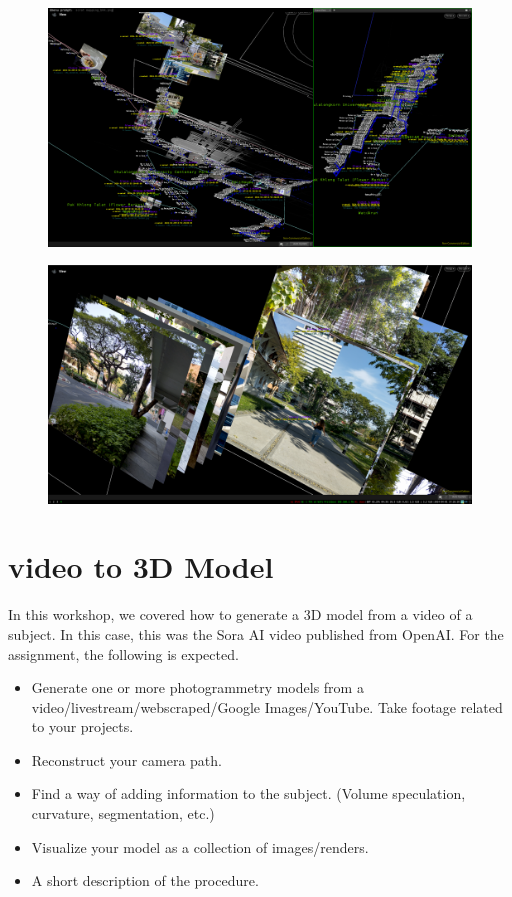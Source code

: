 \documentclass[11pt, a4paper]{article}
\begin{document}
\begin{figure}[H]
	\includegraphics[width=\textwidth]{media/mapping_bkk.png}
\end{figure}

\begin{figure}[H]
	\includegraphics[width=\textwidth]{media/mapping_bkk2.png}
\end{figure}


\newpage
\section {video to 3D Model}

In this workshop, we covered how to generate a 3D model from a video of a
subject. In this case, this was the Sora AI video published from OpenAI. For
the assignment, the following is expected.

\begin{itemize}
	\item Generate one or more photogrammetry models from a
video/livestream/webscraped/Google Images/YouTube. Take footage related to your
projects.  
\item Reconstruct your camera path.
\item Find a way of adding information to the subject.
(Volume speculation, curvature, segmentation, etc.)
 \item Visualize your
model as a collection of images/renders.

	\item A short description of the procedure. 
\end{itemize}
\end{document}
